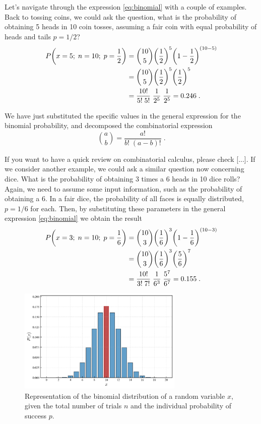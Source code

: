 \documentclass{book}
\begin{document}
Let's navigate through the expression \eqref{eq:binomial} with a couple of examples. Back to tossing coins, we could ask the question, what is the probability of obtaining 5 heads in 10 coin tosses, assuming a fair coin with equal probability of heads and tails $p = 1/2$?
\begin{align}
    P\bigg(x=5; \; n = 10; \; p = \frac{1}{2}\bigg) & = \binom{10}{5} \bigg(\frac{1}{2}\bigg)^5 \bigg(1 - \frac{1}{2}\bigg)^{(10 - 5)}  \notag \\
	& = \binom{10}{5} \bigg(\frac{1}{2}\bigg)^5 \bigg(\frac{1}{2}\bigg)^5 \notag \\
	& = \frac{10!}{5! \; 5!} \; \frac{1}{2^5} \; \frac{1}{2^5} = 0.246 \; . \nonumber
\end{align}

We have just substituted the specific values in the general expression for the binomial probability, and decomposed the combinatorial expression
\begin{equation}
	\binom{a}{b} = \frac{a!}{b! \; (a - b)!} \; .
	\label{eq:combinatorial}
\end{equation}

If you want to have a quick review on combinatorial calculus, please check [...]. If we consider another example, we could ask a similar question now concerning dice. What is the probability of obtaining 3 times a 6 heads in 10 dice rolls? Again, we need to assume some input information, such as the probability of obtaining a 6. In a fair dice, the probability of all faces is equally distributed, $p = 1/6$ for each. Then, by substituting these parameters in the general expression \eqref{eq:binomial} we obtain the result
\begin{align}
    P\bigg(x=3; \; n = 10; \; p = \frac{1}{6}\bigg) & = \binom{10}{3} \bigg(\frac{1}{6}\bigg)^3 \bigg(1 - \frac{1}{6}\bigg)^{(10 - 3)}  \notag \\
	& = \binom{10}{3} \bigg(\frac{1}{6}\bigg)^3 \bigg(\frac{5}{6}\bigg)^7 \notag \\
	& = \frac{10!}{3! \; 7!} \; \frac{1}{6^3} \; \frac{5^7}{6^7} = 0.155 \; . \nonumber
\end{align}

\begin{figure}[ht]
    \centering
    \includegraphics[width=0.7\textwidth]{figures/chapter2/binomial_1.png}
    \caption{Representation of the binomial distribution of a random variable $x$, given the total number of trials $n$ and the individual probability of success $p$.}
    \label{fig:binomial1}
\end{figure}
\end{document}
